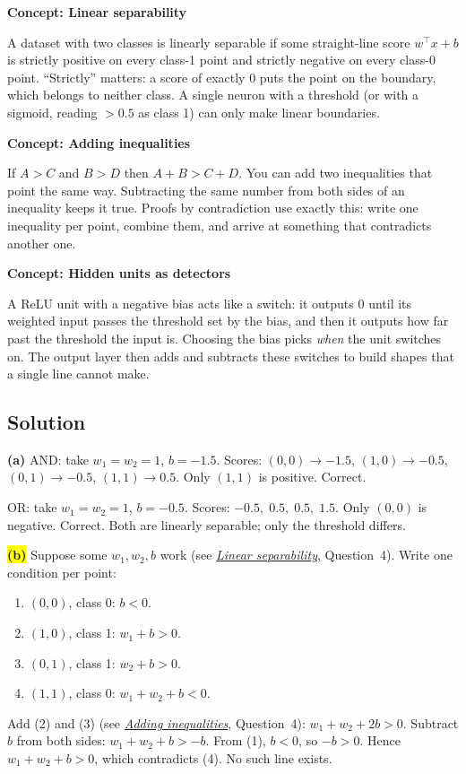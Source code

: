 \documentclass[12pt,a4paper]{article}
\newcommand{\concept}[2]{\par\medskip\phantomsection\label{#1}{\large\bfseries\color{blue!50!black} Concept: #2}\par}
\newcommand{\seeconcept}[3]{(see \hyperref[#1]{\textit{#2}}, Question~#3)}
\newcommand{\hlq}[1]{{\setlength{\fboxsep}{1.5pt}\colorbox{yellow}{#1}}}
\begin{document}
\concept{c:separable}{Linear separability}
A dataset with two classes is linearly separable if some straight-line score $w^\top x+b$ is strictly positive on every class-1 point and strictly negative on every class-0 point. ``Strictly'' matters: a score of exactly 0 puts the point on the boundary, which belongs to neither class. A single neuron with a threshold (or with a sigmoid, reading $>0.5$ as class 1) can only make linear boundaries.

\concept{c:addineq}{Adding inequalities}
If $A>C$ and $B>D$ then $A+B>C+D$. You can add two inequalities that point the same way. Subtracting the same number from both sides of an inequality keeps it true. Proofs by contradiction use exactly this: write one inequality per point, combine them, and arrive at something that contradicts another one.

\concept{c:detectors}{Hidden units as detectors}
A ReLU unit with a negative bias acts like a switch: it outputs 0 until its weighted input passes the threshold set by the bias, and then it outputs how far past the threshold the input is. Choosing the bias picks \emph{when} the unit switches on. The output layer then adds and subtracts these switches to build shapes that a single line cannot make.

\subsection*{Solution}
\textbf{(a)} AND: take $w_1=w_2=1$, $b=-1.5$. Scores: $(0,0)\to-1.5$, $(1,0)\to-0.5$, $(0,1)\to-0.5$, $(1,1)\to0.5$. Only $(1,1)$ is positive. Correct.

OR: take $w_1=w_2=1$, $b=-0.5$. Scores: $-0.5,\;0.5,\;0.5,\;1.5$. Only $(0,0)$ is negative. Correct. Both are linearly separable; only the threshold differs.

\hlq{\textbf{(b)}} Suppose some $w_1,w_2,b$ work \seeconcept{c:separable}{Linear separability}{4}. Write one condition per point:
\begin{enumerate}[nosep,label=(\arabic*)]
\item $(0,0)$, class 0: $b<0$.
\item $(1,0)$, class 1: $w_1+b>0$.
\item $(0,1)$, class 1: $w_2+b>0$.
\item $(1,1)$, class 0: $w_1+w_2+b<0$.
\end{enumerate}
Add (2) and (3) \seeconcept{c:addineq}{Adding inequalities}{4}: $w_1+w_2+2b>0$. Subtract $b$ from both sides: $w_1+w_2+b>-b$. From (1), $b<0$, so $-b>0$. Hence $w_1+w_2+b>0$, which contradicts (4). No such line exists.
\end{document}

